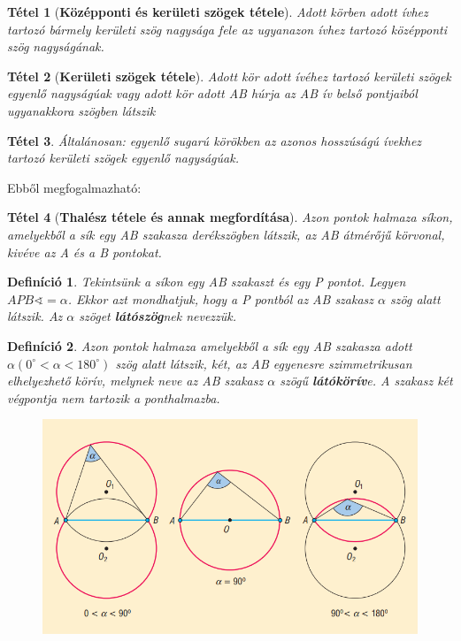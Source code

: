 \documentclass[12pt,a4paper]{article}
\newtheorem{theorem}{Tétel} [section]
\newtheorem{definition}{Definíció} [section]
\begin{document}
\begin{theorem}[\textbf{Középponti és kerületi szögek tétele}]
Adott körben adott ívhez tartozó bármely kerületi szög nagysága fele az ugyanazon ívhez tartozó középponti szög nagyságának.
\end{theorem}

\begin{theorem}[\textbf{Kerületi szögek tétele}]
Adott kör adott ívéhez tartozó kerületi szögek egyenlő nagyságúak vagy adott kör adott AB húrja az AB ív belső pontjaiból ugyanakkora szögben látszik
\end{theorem}

\begin{theorem}
Általánosan: egyenlő sugarú körökben az azonos hosszúságú ívekhez tartozó kerületi szögek egyenlő nagyságúak.
\end{theorem}
Ebből megfogalmazható:
\begin{theorem}[\textbf{Thalész tétele és annak megfordítása}]
Azon pontok halmaza síkon, amelyekből a sík egy AB szakasza derékszögben látszik, az AB átmérőjű körvonal, kivéve az A és a B pontokat.
\end{theorem}

\begin{definition}
Tekintsünk a síkon egy AB szakaszt és egy P pontot. Legyen $APB \sphericalangle=\alpha$. Ekkor azt mondhatjuk, hogy a P pontból az AB szakasz $\alpha$ szög alatt látszik. Az $\alpha$ szöget \textbf{látószög}nek nevezzük.
\end{definition}

\begin{definition}
Azon pontok halmaza amelyekből a sík egy AB szakasza adott $\alpha (0^\circ < \alpha < 180^\circ)$ szög alatt látszik, két, az AB egyenesre szimmetrikusan elhelyezhető körív, melynek neve az AB szakasz $\alpha$ szögű \textbf{látókörív}e. A szakasz két végpontja nem tartozik a ponthalmazba.
\end{definition}
\begin{figure}[h]
\centering
\includegraphics[scale=0.4]{geometry/latorkoriv}
\end{figure}
\newpage
\end{document}
